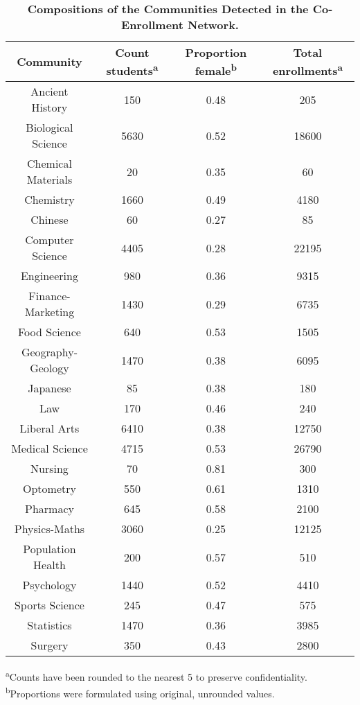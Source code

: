 \begin{table}[!ht]
\caption{\label{Table1} \textbf{Compositions of the Communities Detected in the Co-Enrollment Network.}}
\begin{tabular}{|c|c|c|c|}
\hline
\textbf{Community} & \textbf{Count students\textsuperscript{a}} & \textbf{Proportion female\textsuperscript{b}} & \textbf{Total enrollments\textsuperscript{a}} \\ \hline
Ancient History & 150 & 0.48 & 205 \\
Biological Science & 5630 & 0.52 & 18600 \\
Chemical Materials & 20 & 0.35 & 60 \\
Chemistry & 1660 & 0.49 & 4180 \\
Chinese & 60 & 0.27 & 85 \\
Computer Science & 4405 & 0.28 & 22195 \\
Engineering & 980 & 0.36 & 9315 \\
Finance-Marketing & 1430 & 0.29 & 6735 \\
Food Science & 640 & 0.53 & 1505 \\
Geography-Geology & 1470 & 0.38 & 6095 \\
Japanese & 85 & 0.38 & 180 \\
Law & 170 & 0.46 & 240 \\
Liberal Arts & 6410 & 0.38 & 12750 \\
Medical Science & 4715 & 0.53 & 26790 \\
Nursing & 70 & 0.81 & 300 \\
Optometry & 550 & 0.61 & 1310 \\
Pharmacy & 645 & 0.58 & 2100 \\
Physics-Maths & 3060 & 0.25 & 12125 \\
Population Health & 200 & 0.57 & 510 \\
Psychology & 1440 & 0.52 & 4410 \\
Sports Science & 245 & 0.47 & 575 \\
Statistics & 1470 & 0.36 & 3985 \\
Surgery & 350 & 0.43 & 2800 \\ \hline
\end{tabular}
\begin{flushleft}\textsuperscript{a}Counts have been rounded to the nearest 5 to preserve confidentiality.
\newline
\textsuperscript{b}Proportions were formulated using original, unrounded values.
\end{flushleft}
\label{table1}
\end{table}


